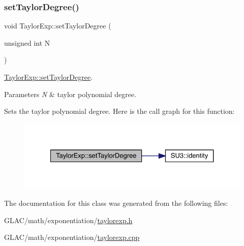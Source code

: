\subsubsection{\texorpdfstring{setTaylorDegree()}{setTaylorDegree()}}
{\footnotesize\ttfamily void Taylor\+Exp\+::set\+Taylor\+Degree (\begin{DoxyParamCaption}\item[{unsigned int}]{N }\end{DoxyParamCaption})}



\mbox{\hyperlink{class_taylor_exp_a6a048363483f372300e412b27f218773}{Taylor\+Exp\+::set\+Taylor\+Degree}}. 


\begin{DoxyParams}{Parameters}
{\em N} & taylor polynomial degree.\\
\hline
\end{DoxyParams}
Sets the taylor polynomial degree. Here is the call graph for this function\+:\nopagebreak
\begin{figure}[H]
\begin{center}
\leavevmode
\includegraphics[width=327pt]{class_taylor_exp_a6a048363483f372300e412b27f218773_cgraph}
\end{center}
\end{figure}


The documentation for this class was generated from the following files\+:\begin{DoxyCompactItemize}
\item 
G\+L\+A\+C/math/exponentiation/\mbox{\hyperlink{taylorexp_8h}{taylorexp.\+h}}\item 
G\+L\+A\+C/math/exponentiation/\mbox{\hyperlink{taylorexp_8cpp}{taylorexp.\+cpp}}\end{DoxyCompactItemize}
